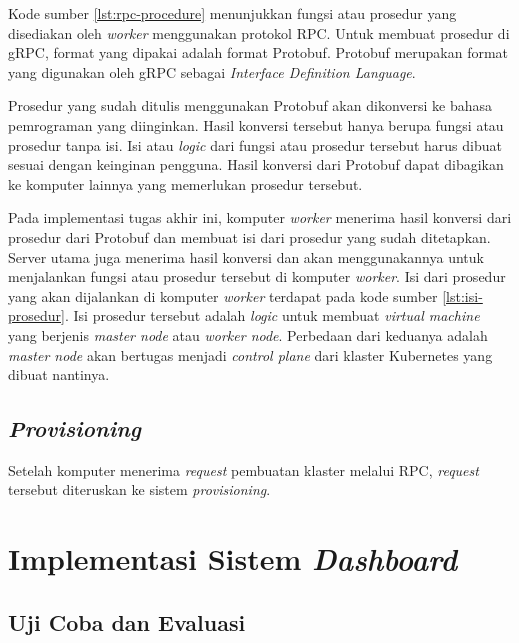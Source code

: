 Kode sumber \ref{lst:rpc-procedure} menunjukkan fungsi atau prosedur
yang disediakan oleh \emph{worker} menggunakan protokol RPC. Untuk membuat prosedur
di gRPC, format yang dipakai adalah format Protobuf. Protobuf merupakan format
yang digunakan oleh gRPC sebagai \emph{Interface Definition Language}.

Prosedur yang sudah ditulis menggunakan Protobuf akan dikonversi
ke bahasa pemrograman yang diinginkan. Hasil konversi tersebut hanya
berupa fungsi atau prosedur tanpa isi. Isi atau \emph{logic} dari fungsi atau prosedur
tersebut harus dibuat sesuai dengan keinginan pengguna. Hasil konversi dari Protobuf
dapat dibagikan ke komputer lainnya yang memerlukan prosedur tersebut. 

Pada implementasi tugas akhir ini, komputer \emph{worker} menerima
hasil konversi dari prosedur dari Protobuf dan membuat isi dari
prosedur yang sudah ditetapkan. Server utama juga menerima hasil konversi
dan akan menggunakannya untuk menjalankan fungsi atau prosedur tersebut di komputer
\emph{worker}. Isi dari prosedur yang akan dijalankan di komputer \emph{worker} terdapat
pada kode sumber \ref{lst:isi-prosedur}. Isi prosedur tersebut adalah \emph{logic}
untuk membuat \emph{virtual machine} yang berjenis \emph{master node} atau \emph{worker node}.
Perbedaan dari keduanya adalah \emph{master node} akan bertugas menjadi \emph{control plane}
dari klaster Kubernetes yang dibuat nantinya.

\clearpage



\subsection{\emph{Provisioning}}
\label{sec:provisioning}

Setelah komputer menerima \emph{request} pembuatan klaster melalui RPC,
\emph{request} tersebut diteruskan ke sistem \emph{provisioning}.

\section{Implementasi Sistem \emph{Dashboard}}
\label{sec:implementas-sistem-dashboard}

\subsection{Uji Coba dan Evaluasi}
\label{sec:uji-coba-dan-evaluasi}

